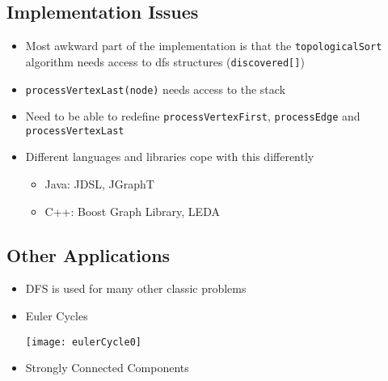 \begin{slide}
\section{Implementation Issues}

\begin{PauseHighLight}
  \begin{itemize}
  \item Most awkward part of the implementation is that the
    \texttt{topologicalSort} algorithm needs access to dfs structures
    (\texttt{discovered[]})\pause
  \item \texttt{processVertexLast(node)} needs access to the stack\pause
  \item Need to be able to redefine \texttt{processVertexFirst},
    \texttt{processEdge} and \texttt{processVertexLast}\pause
  \item Different languages and libraries cope with this differently
    \begin{itemize}
    \item Java: JDSL, JGraphT
    \item C++: Boost Graph Library, LEDA\pause
    \end{itemize}
  \end{itemize}
\end{PauseHighLight}

\end{slide}


\begin{slide}
\section[-2]{Other Applications}

\pb
\begin{itemize}
\item DFS is used for many other classic problems\pauseh
\item Euler Cycles \pauseh \hfil
  \begin{minipage}{0.3\linewidth}
    \begin{center}
      \texttt{[image: eulerCycle0]}
      {}
    \end{center}
  \end{minipage}
\item Strongly Connected Components\pauseh{}\pause
\end{itemize}

\end{slide}


